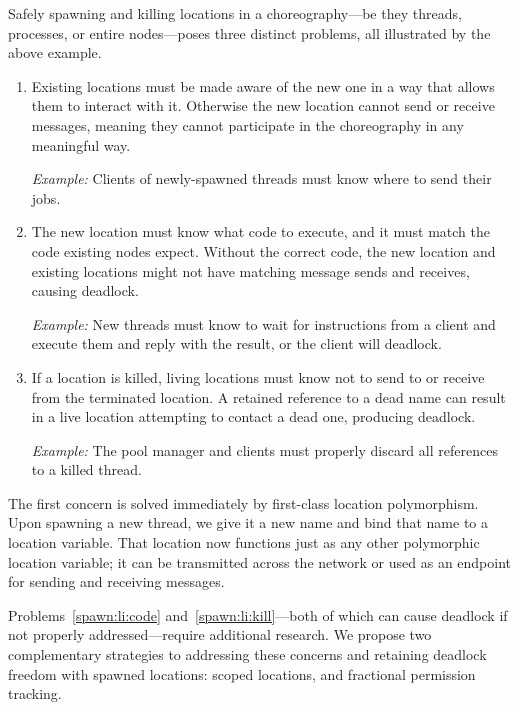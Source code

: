 Safely spawning and killing locations in a choreography---be they threads, processes, or entire nodes---poses three distinct problems,
all illustrated by the above example.
\begin{enumerate}
  \item\label{spawn:li:name}
    Existing locations must be made aware of the new one in a way that allows them to interact with it.
    Otherwise the new location cannot send or receive messages, meaning they cannot participate in the choreography in any meaningful way.

    \textit{Example:} Clients of newly-spawned threads must know where to send their jobs.
  \item\label{spawn:li:code}
    The new location must know what code to execute, and it must match the code existing nodes expect.
    Without the correct code, the new location and existing locations might not have matching message sends and receives, causing deadlock.

    \textit{Example:} New threads must know to wait for instructions from a client and execute them
    and reply with the result, or the client will deadlock.
  \item\label{spawn:li:kill}
    If a location is killed, living locations must know not to send to or receive from the terminated location.
    A retained reference to a dead name can result in a live location attempting to contact a dead one, producing deadlock.

    \textit{Example:} The pool manager and clients must properly discard all references to a killed thread.
\end{enumerate}

The first concern is solved immediately by first-class location polymorphism.
Upon spawning a new thread, we give it a new name and bind that name to a location variable.
That location now functions just as any other polymorphic location variable;
it can be transmitted across the network or used as an endpoint for sending and receiving messages.

Problems~\ref{spawn:li:code} and~\ref{spawn:li:kill}---both of which can cause deadlock if not properly addressed---require additional research.
We propose two complementary strategies to addressing these concerns and retaining deadlock freedom with spawned locations:
scoped locations, and fractional permission tracking.

